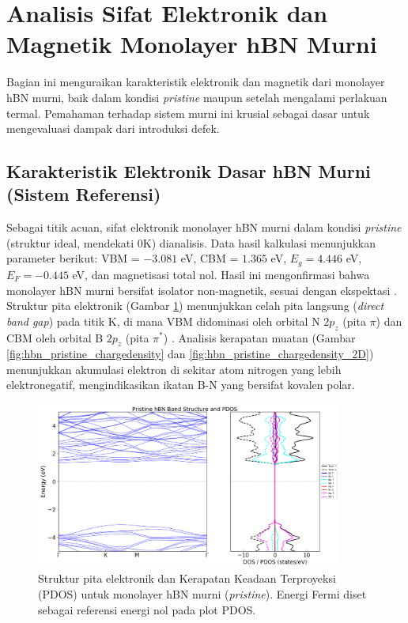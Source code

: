 \section{Analisis Sifat Elektronik dan Magnetik Monolayer hBN Murni}
\label{sec:hbn_murni}
Bagian ini menguraikan karakteristik elektronik dan magnetik dari monolayer hBN murni, baik dalam kondisi \textit{pristine} maupun setelah mengalami perlakuan termal. Pemahaman terhadap sistem murni ini krusial sebagai dasar untuk mengevaluasi dampak dari introduksi defek.

\subsection{Karakteristik Elektronik Dasar hBN Murni (Sistem Referensi)}
\label{subsec:hbn_murni_dasar}
Sebagai titik acuan, sifat elektronik monolayer hBN murni dalam kondisi \textit{pristine} (struktur ideal, mendekati 0K) dianalisis. Data hasil kalkulasi menunjukkan parameter berikut: VBM = $-3.081$ eV, CBM = $1.365$ eV, $E_g = 4.446$ eV, $E_F = -0.445$ eV, dan magnetisasi total nol. Hasil ini mengonfirmasi bahwa monolayer hBN murni bersifat isolator non-magnetik, sesuai dengan ekspektasi \citep{Watanabe2004}. Struktur pita elektronik (Gambar \ref{fig:hbn_pristine_bs_pdos}) menunjukkan celah pita langsung (\textit{direct band gap}) pada titik K, di mana VBM didominasi oleh orbital N $2p_z$ (pita $\pi$) dan CBM oleh orbital B $2p_z$ (pita $\pi^*$) \citep{sachs2011}. Analisis kerapatan muatan (Gambar \ref{fig:hbn_pristine_chargedensity} dan \ref{fig:hbn_pristine_chargedensity_2D}) menunjukkan akumulasi elektron di sekitar atom nitrogen yang lebih elektronegatif, mengindikasikan ikatan B-N yang bersifat kovalen polar.

\begin{figure}[h!]
    \centering
    \includegraphics[width=0.9\textwidth]{gambar_hasil/simple_bands_pdos_pristine.png}
    \caption{Struktur pita elektronik dan Kerapatan Keadaan Terproyeksi (PDOS) untuk monolayer hBN murni (\textit{pristine}). Energi Fermi diset sebagai referensi energi nol pada plot PDOS.}
    \label{fig:hbn_pristine_bs_pdos}
\end{figure}

